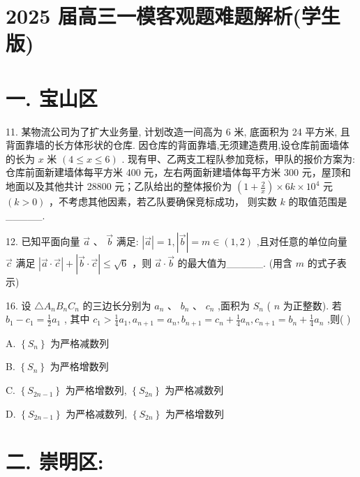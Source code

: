 \documentclass[10pt]{article}
\begin{document}
\section*{2025 届高三一模客观题难题解析(学生版)}

\section*{一. 宝山区}

11. 某物流公司为了扩大业务量, 计划改造一间高为 6 米, 底面积为 24 平方米, 且背面靠墙的长方体形状的仓库. 因仓库的背面靠墙,无须建造费用,设仓库前面墙体的长为 \(x\) 米 \(\left( {4 \leq  x \leq  6}\right)\) . 现有甲、乙两支工程队参加竞标，甲队的报价方案为:仓库前面新建墙体每平方米 400 元，左右两面新建墙体每平方米 300 元，屋顶和地面以及其他共计 28800 元；乙队给出的整体报价为 \(\left( {1 + \frac{2}{x}}\right)  \times  {6k} \times  {10}^{4}\) 元 \(\left( {k > 0}\right)\) ，不考虑其他因素，若乙队要确保竞标成功， 则实数 \(k\) 的取值范围是\_\_\_\_\_.

12. 已知平面向量 \(\overrightarrow{a}\text{ 、 }\overrightarrow{b}\) 满足: \(\left| \overrightarrow{a}\right|  = 1,\left| \overrightarrow{b}\right|  = m \in  \left( {1,2}\right)\) ,且对任意的单位向量 \(\overrightarrow{c}\) 满足 \(\left| {\overrightarrow{a} \cdot  \overrightarrow{c}}\right|  + \left| {\overrightarrow{b} \cdot  \overrightarrow{c}}\right|  \leq  \sqrt{6}\) ，则 \(\overrightarrow{a} \cdot  \overrightarrow{b}\) 的最大值为\_\_\_\_\_. (用含 \(m\) 的式子表示)

16. 设 \(\bigtriangleup {A}_{n}{B}_{n}{C}_{n}\) 的三边长分别为 \({a}_{n}\text{ 、 }{b}_{n}\text{ 、 }{c}_{n}\) ,面积为 \({S}_{n}\) ( \(n\) 为正整数). 若 \({b}_{1} - {c}_{1} = \frac{1}{2}{a}_{1}\) , 其中 \({c}_{1} > \frac{1}{4}{a}_{1},{a}_{n + 1} = {a}_{n},{b}_{n + 1} = {c}_{n} + \frac{1}{4}{a}_{n},{c}_{n + 1} = {b}_{n} + \frac{1}{4}{a}_{n}\) ,则(   )

A. \(\left\{  {S}_{n}\right\}\) 为严格减数列

B. \(\left\{  {S}_{n}\right\}\) 为严格增数列

C. \(\left\{  {S}_{{2n} - 1}\right\}\) 为严格增数列, \(\left\{  {S}_{2n}\right\}\) 为严格减数列

D. \(\left\{  {S}_{{2n} - 1}\right\}\) 为严格减数列, \(\left\{  {S}_{2n}\right\}\) 为严格增数列

\section*{二. 崇明区:}
\end{document}
